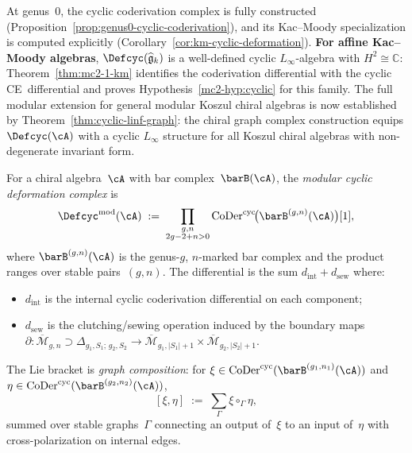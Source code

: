 \begin{definition}
At genus~$0$, the cyclic coderivation complex is fully constructed
(Proposition~\ref{prop:genus0-cyclic-coderivation}), and its
Kac--Moody specialization is computed explicitly
(Corollary~\ref{cor:km-cyclic-deformation}).
\textbf{For affine Kac--Moody algebras}, $\Defcyc(\widehat{\mathfrak{g}}_k)$
is a well-defined cyclic $L_\infty$-algebra with
$H^2 \cong \mathbb{C}$: Theorem~\ref{thm:mc2-1-km} identifies the
coderivation differential with the cyclic CE~differential and proves
Hypothesis~\ref{mc2-hyp:cyclic} for this family.
The full modular extension for general modular Koszul chiral
algebras is now established by
Theorem~\ref{thm:cyclic-linf-graph}: the chiral graph complex
construction equips $\Defcyc(\cA)$ with a cyclic $L_\infty$
structure for all Koszul chiral algebras with non-degenerate
invariant form.
\end{definition}

\begin{definition}
\label{def:modular-cyclic-deformation-complex}
For a chiral algebra~$\cA$ with bar
complex~$\barB(\cA)$, the \emph{modular cyclic deformation complex} is
\begin{equation}\label{eq:modular-cyc-def-complex}
\Defcyc^{\mathrm{mod}}(\cA)
\;:=\;
\prod_{\substack{g,n \\ 2g-2+n>0}}
\operatorname{CoDer}^{\mathrm{cyc}}\!\bigl(
 \barB^{(g,n)}(\cA)
\bigr)[1],
\end{equation}
where $\barB^{(g,n)}(\cA)$ is the genus-$g$, $n$-marked bar complex
and the product ranges over stable pairs~$(g,n)$.
The differential is the sum $d_{\mathrm{int}} + d_{\mathrm{sew}}$
where:
\begin{itemize}
\item $d_{\mathrm{int}}$ is the internal cyclic coderivation
 differential on each component;
\item $d_{\mathrm{sew}}$ is the clutching/sewing operation induced by
 the boundary maps
 $\partial\colon \overline{\mathcal{M}}_{g,n} \supset
 \Delta_{g_1,S_1;\,g_2,S_2} \to
 \overline{\mathcal{M}}_{g_1,|S_1|+1} \times
 \overline{\mathcal{M}}_{g_2,|S_2|+1}$.
\end{itemize}

The Lie bracket is \emph{graph composition}: for
$\xi \in \operatorname{CoDer}^{\mathrm{cyc}}(\barB^{(g_1,n_1)}(\cA))$
and
$\eta \in \operatorname{CoDer}^{\mathrm{cyc}}(\barB^{(g_2,n_2)}(\cA))$,
\begin{equation}\label{eq:modular-cyc-graph-bracket}
[\xi,\eta]
\;:=\;
\sum_{\Gamma}\xi \circ_\Gamma \eta,
\end{equation}
summed over stable graphs~$\Gamma$ connecting an output of~$\xi$ to an
input of~$\eta$ with cross-polarization on internal edges.
\end{definition}

